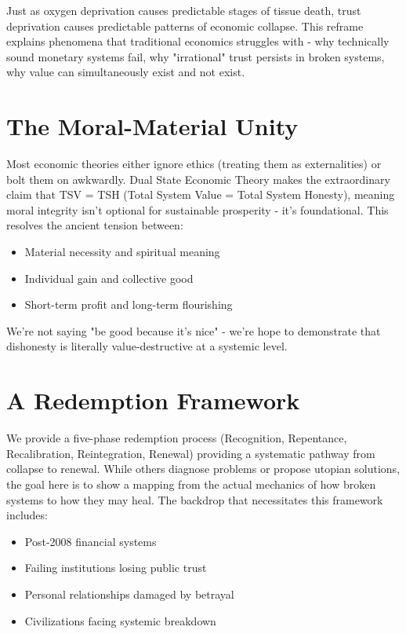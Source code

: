 \documentclass[11pt,oneside]{book}
\begin{document}
Just as oxygen deprivation causes predictable stages of tissue death, trust deprivation causes predictable patterns of economic collapse. This reframe explains phenomena that traditional economics struggles with - why technically sound monetary systems fail, why "irrational" trust persists in broken systems, why value can simultaneously exist and not exist.

\section*{The Moral-Material Unity}

Most economic theories either ignore ethics (treating them as externalities) or bolt them on awkwardly. Dual State Economic Theory makes the extraordinary claim that TSV = TSH (Total System Value = Total System Honesty), meaning moral integrity isn't optional for sustainable prosperity - it's foundational. This resolves the ancient tension between:

\begin{itemize}
\item Material necessity and spiritual meaning
\item Individual gain and collective good
\item Short-term profit and long-term flourishing
\end{itemize}

We're not saying "be good because it's nice" - we're hope to demonstrate that dishonesty is literally value-destructive at a systemic level.

\section*{A Redemption Framework}

We provide a five-phase redemption process (Recognition, Repentance, Recalibration, Reintegration, Renewal) providing a systematic pathway from collapse to renewal.  While others diagnose problems or propose utopian solutions, the goal here is to show a mapping from the actual mechanics of how broken systems to how they may heal. The backdrop that necessitates this framework includes:

\begin{itemize}
\item Post-2008 financial systems
\item Failing institutions losing public trust
\item Personal relationships damaged by betrayal
\item Civilizations facing systemic breakdown
\end{itemize}
\end{document}
